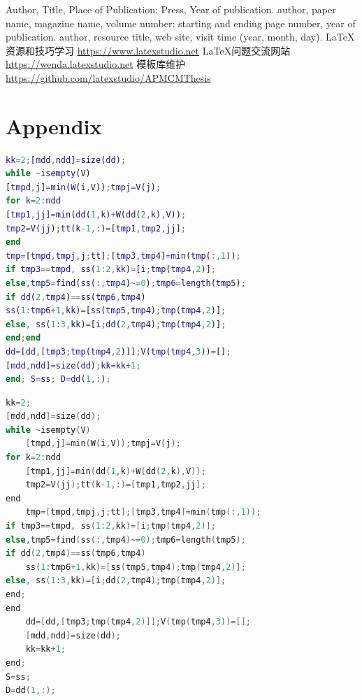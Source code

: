 \documentclass{apmcmthesis}
\begin{document}
\subsubsection{}


\subsubsection{}



\subsubsection{}





\begin{thebibliography}{9}%
 Author, Title, Place of Publication: Press, Year of publication.
 author, paper name, magazine name, volume number: starting and ending
page number, year of publication.
 author, resource title, web site, visit time (year, month, day).
 \LaTeX{}{资源和技巧学习} \url{https://www.latexstudio.net}
 \LaTeX{}{问题交流网站} \url{https://wenda.latexstudio.net}
 {模板库维护} \url{https://github.com/latexstudio/APMCMThesis}
\end{thebibliography}

\newpage

\section{Appendix}
\begin{lstlisting}[language=matlab,caption={The matlab Source code of Algorithm}]
kk=2;[mdd,ndd]=size(dd);
while ~isempty(V)
[tmpd,j]=min(W(i,V));tmpj=V(j);
for k=2:ndd
[tmp1,jj]=min(dd(1,k)+W(dd(2,k),V));
tmp2=V(jj);tt(k-1,:)=[tmp1,tmp2,jj];
end
tmp=[tmpd,tmpj,j;tt];[tmp3,tmp4]=min(tmp(:,1));
if tmp3==tmpd, ss(1:2,kk)=[i;tmp(tmp4,2)];
else,tmp5=find(ss(:,tmp4)~=0);tmp6=length(tmp5);
if dd(2,tmp4)==ss(tmp6,tmp4)
ss(1:tmp6+1,kk)=[ss(tmp5,tmp4);tmp(tmp4,2)];
else, ss(1:3,kk)=[i;dd(2,tmp4);tmp(tmp4,2)];
end;end
dd=[dd,[tmp3;tmp(tmp4,2)]];V(tmp(tmp4,3))=[];
[mdd,ndd]=size(dd);kk=kk+1;
end; S=ss; D=dd(1,:);
 \end{lstlisting}
\begin{lstlisting}[language=c,caption={The lingo source code}]
kk=2;
[mdd,ndd]=size(dd);
while ~isempty(V)
    [tmpd,j]=min(W(i,V));tmpj=V(j);
for k=2:ndd
    [tmp1,jj]=min(dd(1,k)+W(dd(2,k),V));
    tmp2=V(jj);tt(k-1,:)=[tmp1,tmp2,jj];
end
    tmp=[tmpd,tmpj,j;tt];[tmp3,tmp4]=min(tmp(:,1));
if tmp3==tmpd, ss(1:2,kk)=[i;tmp(tmp4,2)];
else,tmp5=find(ss(:,tmp4)~=0);tmp6=length(tmp5);
if dd(2,tmp4)==ss(tmp6,tmp4)
    ss(1:tmp6+1,kk)=[ss(tmp5,tmp4);tmp(tmp4,2)];
else, ss(1:3,kk)=[i;dd(2,tmp4);tmp(tmp4,2)];
end;
end
    dd=[dd,[tmp3;tmp(tmp4,2)]];V(tmp(tmp4,3))=[];
    [mdd,ndd]=size(dd);
    kk=kk+1;
end;
S=ss;
D=dd(1,:);
 \end{lstlisting}
\end{document}
